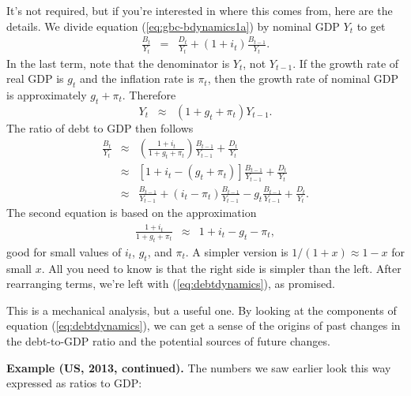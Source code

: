 It's not required, but if you're interested in where this comes from,
here are the details.
We divide equation (\ref{eq:gbc-bdynamics1a}) by nominal GDP $Y_t$ to get
\begin{eqnarray*}
    \frac{B_{t}}{Y_{t}} &=& %
            \frac{D_{t}}{Y_{t}}
            +  (1+i_t) \frac{B_{t-1}}{Y_{t}}  .
\end{eqnarray*}
In the last term, note that the denominator is $Y_t$, not $Y_{t-1}$.
If the growth rate of real GDP is $g_t$ and the inflation rate is $\pi_t$,
then the growth rate of nominal GDP is approximately $g_t + \pi_t$.
Therefore
\[
    Y_{t} \;\;\approx\;\; (1+g_t+\pi_t) Y_{t-1}.
\]
The ratio of debt to GDP then follows
\begin{eqnarray*}
    \frac{B_{t}}{Y_{t}}
            &\approx&
                \left( \frac{1+i_t}{1+g_t+\pi_t} \right)  \frac{B_{t-1}}{Y_{t-1}}
             +    \frac{D_{t}}{Y_{t}}  \nonumber \\
            &\approx&
                \left[ 1 + i_t - (g_t+\pi_t) \right]  \frac{B_{t-1}}{Y_{t-1}}
             +    \frac{D_{t}}{Y_{t}}   \nonumber \\
            &\approx&
                \frac{B_{t-1}}{Y_{t-1}} + (i_t-\pi_t) \frac{B_{t-1}}{Y_{t-1}}
                - g_t \frac{B_{t-1}}{Y_{t-1}}
             +    \frac{D_{t}}{Y_{t}}  .
\end{eqnarray*}
The second equation is based on the approximation
\begin{eqnarray*}
    \frac{1+i_t}{1+g_t+\pi_t} &\approx& 1 + i_t - g_t - \pi_t ,
\end{eqnarray*}
good for small values of $i_t$, $g_t$, and $\pi_t$.
A simpler version is $1/(1+x) \approx 1-x $ for small $x$.
All you need to know is that the right side is simpler than the left.
After rearranging terms, we're left with (\ref{eq:debtdynamics}), as promised.


This is a mechanical analysis, but a useful one.
By looking at the components of equation (\ref{eq:debtdynamics}),
we can get a sense of the origins of past changes in the debt-to-GDP ratio
and the potential sources of future changes.


{\bf Example (US, 2013, continued).}
The numbers we saw earlier look this way expressed as ratios to GDP:

